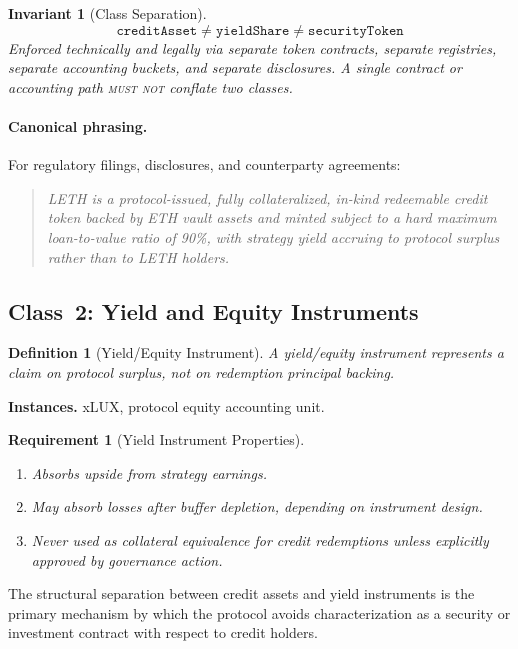 \documentclass[11pt,twocolumn]{article}
\newtheorem{definition}{Definition}[section]
\newtheorem{invariant}{Invariant}[section]
\newtheorem{requirement}{Requirement}[section]
\theoremstyle{remark}
\begin{document}
\begin{invariant}[Class Separation]
\label{inv:class-sep}
\[
  \texttt{creditAsset} \neq \texttt{yieldShare} \neq \texttt{securityToken}
\]
Enforced technically and legally via separate token contracts, separate registries, separate accounting buckets, and separate disclosures. A single contract or accounting path \textsc{must not} conflate two classes.
\end{invariant}

\paragraph{Canonical phrasing.} For regulatory filings, disclosures, and counterparty agreements:

\begin{quote}
\emph{LETH is a protocol-issued, fully collateralized, in-kind redeemable credit token backed by ETH vault assets and minted subject to a hard maximum loan-to-value ratio of 90\%, with strategy yield accruing to protocol surplus rather than to LETH holders.}
\end{quote}


\subsection{Class~2: Yield and Equity Instruments}
\label{sec:yield}

\begin{definition}[Yield/Equity Instrument]
A yield/equity instrument represents a claim on protocol surplus, not on redemption principal backing.
\end{definition}

\noindent\textbf{Instances.} xLUX, protocol equity accounting unit.

\begin{requirement}[Yield Instrument Properties]
\label{req:yield}
\begin{enumerate}[nosep]
  \item Absorbs upside from strategy earnings.
  \item May absorb losses after buffer depletion, depending on instrument design.
  \item Never used as collateral equivalence for credit redemptions unless explicitly approved by governance action.
\end{enumerate}
\end{requirement}

The structural separation between credit assets and yield instruments is the primary mechanism by which the protocol avoids characterization as a security or investment contract with respect to credit holders.
\end{document}
